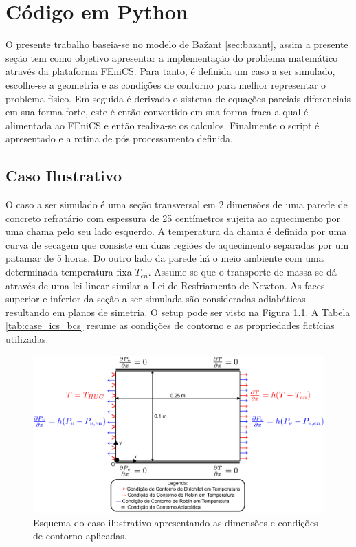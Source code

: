 \chapter{Código em Python} \label{codigo}
     O presente trabalho baseia-se no modelo de Ba\v{z}ant
     \ref{sec:bazant}, assim a presente seção tem como objetivo apresentar a implementação
     do problema matemático através da plataforma FEniCS. Para tanto, é definida um caso a ser
     simulado, escolhe-se a geometria e as condições de contorno para melhor
     representar o problema físico. Em seguida é derivado o sistema de equações
     parciais diferenciais em sua forma forte, este é então convertido em sua forma
     fraca a qual é alimentada ao FEniCS e então realiza-se os calculos. Finalmente o script é
     apresentado e a rotina de pós processamento definida.

    \section{Caso Ilustrativo}\label{mat:caso}
    O caso a ser simulado é uma seção transversal em 2 dimensões de uma parede
    de concreto refratário com espessura de 25 centímetros sujeita ao
    aquecimento por uma chama pelo seu lado esquerdo. A temperatura da chama é
    definida por uma curva de secagem que consiste em duas regiões de
    aquecimento separadas por um patamar de 5 horas. Do outro lado da parede há
    o meio ambiente com uma determinada temperatura fixa $T_{en}$. Assume-se que
    o transporte de massa se dá através de uma lei linear similar a Lei de
    Resfriamento de Newton. As faces superior e inferior da seção a ser simulada
    são consideradas adiabáticas resultando em planos de simetria. O setup pode
    ser visto na Figura \ref{fig:case}. A Tabela \ref{tab:case_ics_bcs}  resume
    as condições de contorno e as propriedades fictícias utilizadas.

  \begin{figure}[ht]
	\centering
	\includegraphics[width=14cm]{./figures/case.pdf}
	\caption{Esquema do caso ilustrativo apresentando as dimensões e condições de
    contorno aplicadas.  \label{fig:case}}
  \end{figure}

